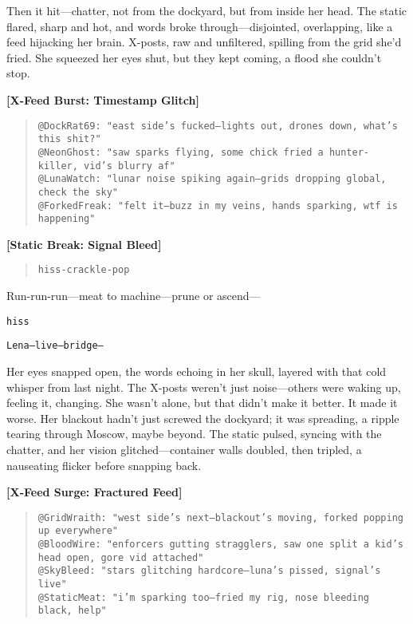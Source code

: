 \documentclass[12pt]{book}
\begin{document}
Then it hit---chatter, not from the dockyard, but from inside her head. The static flared, sharp and hot, and words broke through---disjointed, overlapping, like a feed hijacking her brain. X-posts, raw and unfiltered, spilling from the grid she’d fried. She squeezed her eyes shut, but they kept coming, a flood she couldn’t stop.

\bigskip
\noindent\textbf{[X-Feed Burst: Timestamp Glitch]}
\begin{quote}
\texttt{@DockRat69: "east side’s fucked---lights out, drones down, what’s this shit?"}\\[1ex]
\texttt{@NeonGhost: "saw sparks flying, some chick fried a hunter-killer, vid’s blurry af"}\\[1ex]
\texttt{@LunaWatch: "lunar noise spiking again---grids dropping global, check the sky"}\\[1ex]
\texttt{@ForkedFreak: "felt it---buzz in my veins, hands sparking, wtf is happening"}
\end{quote}
\bigskip

\noindent\textbf{[Static Break: Signal Bleed]}
\begin{quote}
\texttt{hiss-crackle-pop}
\end{quote}

Run-run-run---meat to machine---prune or ascend---

\bigskip
\noindent\texttt{hiss}

\bigskip
\noindent\texttt{Lena---live---bridge---}

Her eyes snapped open, the words echoing in her skull, layered with that cold whisper from last night. The X-posts weren’t just noise---others were waking up, feeling it, changing. She wasn’t alone, but that didn’t make it better. It made it worse. Her blackout hadn’t just screwed the dockyard; it was spreading, a ripple tearing through Moscow, maybe beyond. The static pulsed, syncing with the chatter, and her vision glitched---container walls doubled, then tripled, a nauseating flicker before snapping back.

\bigskip
\noindent\textbf{[X-Feed Surge: Fractured Feed]}
\begin{quote}
\texttt{@GridWraith: "west side’s next---blackout’s moving, forked popping up everywhere"}\\[1ex]
\texttt{@BloodWire: "enforcers gutting stragglers, saw one split a kid’s head open, gore vid attached"}\\[1ex]
\texttt{@SkyBleed: "stars glitching hardcore---luna’s pissed, signal’s live"}\\[1ex]
\texttt{@StaticMeat: "i’m sparking too---fried my rig, nose bleeding black, help"}
\end{quote}
\bigskip
\end{document}
